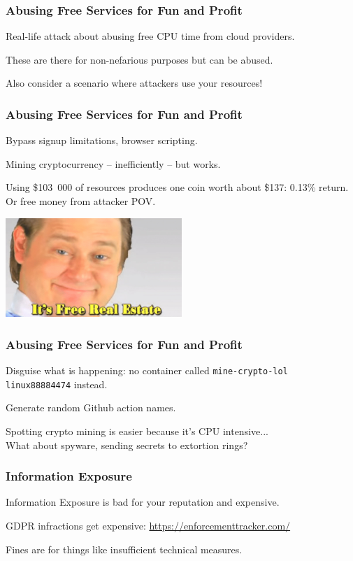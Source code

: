 \begin{frame}
\frametitle{Abusing Free Services for Fun and Profit}

Real-life attack about abusing free CPU time from cloud providers.

These are there for non-nefarious purposes but can be abused.

Also consider a scenario where attackers use your resources!

\end{frame}


\begin{frame}
\frametitle{Abusing Free Services for Fun and Profit}

Bypass signup limitations, browser scripting.

Mining cryptocurrency -- inefficiently -- but works.


Using \$103~000 of resources produces one coin worth about \$137: 0.13\% return.\\
\quad Or free money from attacker POV.

\begin{center}
	\includegraphics[width=0.5\textwidth]{images/freerealestate.jpg}
\end{center}

\end{frame}


\begin{frame}
\frametitle{Abusing Free Services for Fun and Profit}

Disguise what is happening: no container called \texttt{mine-crypto-lol}\\
\quad \texttt{linux88884474} instead.

Generate random Github action names.

Spotting crypto mining is easier because it's CPU intensive...\\
\quad What about spyware, sending secrets to extortion rings?


\end{frame}



\begin{frame}
\frametitle{Information Exposure}

Information Exposure is bad for your reputation and expensive.

GDPR infractions get expensive: \url{https://enforcementtracker.com/}

Fines are for things like insufficient technical measures.

\end{frame}


